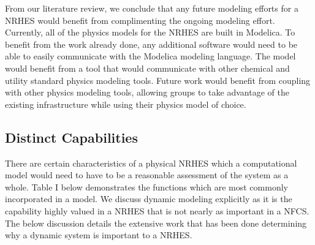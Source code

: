 \documentclass{article}                                                                           %
\begin{document}
\begin{linenumbers}
From our literature review, we conclude that any future modeling efforts for a NRHES would benefit from complimenting the ongoing modeling effort. Currently, all of the physics models for the NRHES are built in Modelica. To benefit from the work already done, any additional software would need to be able to easily communicate with the Modelica modeling language.  The model would benefit from a tool that would communicate with other chemical and utility standard physics modeling tools. Future work would benefit from coupling with other physics modeling tools, allowing groups to take advantage of the existing infrastructure while using their physics model of choice.

\subsection{Distinct Capabilities}
There are certain characteristics of a physical NRHES which a computational model would need to have to be a reasonable assessment of the system as a whole. Table I below demonstrates the functions which are most commonly incorporated in a model. We discuss dynamic modeling explicitly as it is the capability highly valued in a NRHES that is not nearly as important in a NFCS. The below discussion details the extensive work that has been done determining why a dynamic system is important to a NRHES.


\end{linenumbers}
\end{document}
